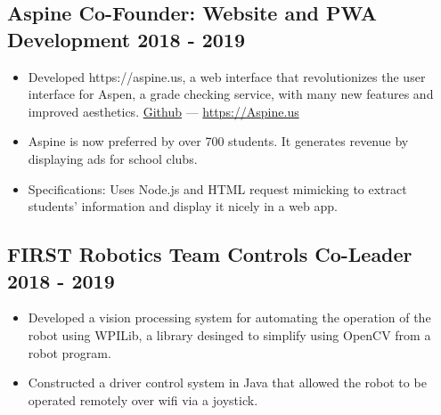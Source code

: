 \documentclass{article}
\begin{document}
\subsection{Aspine Co-Founder: Website and PWA Development \hfill 2018 - 2019}
\begin{itemize}[leftmargin=0.5in]
  \setlength\itemsep{0.00em}
  \item Developed https://aspine.us, a web interface that revolutionizes the user interface for Aspen, a grade checking service, with many new features and improved aesthetics. \href{https://github.com/Aspine/aspine}{Github} --- \href{https://aspine.us}{https://Aspine.us}
  \item Aspine is now preferred by over 700 students. It generates revenue by displaying ads for school clubs.
  \item Specifications: Uses Node.js and HTML request mimicking to extract students’ information and display it nicely in a web app.
\end{itemize}

\subsection{FIRST Robotics Team Controls Co-Leader \hfill 2018 - 2019}
\begin{itemize}[leftmargin=0.5in]
  \setlength\itemsep{0.00em}
  \item Developed a vision processing system for automating the operation of the robot using WPILib, a library desinged to simplify using OpenCV from a robot program.
  \item Constructed a driver control system in Java that allowed the robot to be operated remotely over wifi via a joystick.
\end{itemize}

\end{document}
